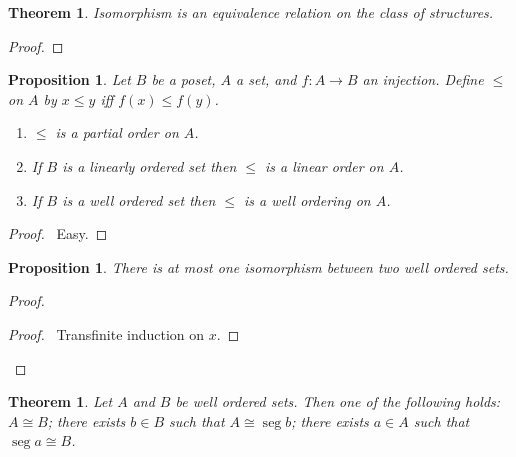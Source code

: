 \documentclass{book}
\let\qed\relax
\newtheorem{prop}[ax]{Proposition}
\newtheorem{thm}[ax]{Theorem}
\theoremstyle{definition}
\newcommand{\seg}{\ensuremath{\operatorname{seg}}}
\begin{document}
\begin{thm}
Isomorphism is an equivalence relation on the class of structures.
\end{thm}

\begin{proof}
\pf
{}
\qed
\end{proof}

\begin{prop}
Let $B$ be a poset, $A$ a set, and $f : A \rightarrow B$ an injection. Define $\leq$ on $A$ by $x \leq y$ iff $f(x) \leq f(y)$.
\begin{enumerate}
\item $\leq$ is a partial order on $A$.
\item If $B$ is a linearly ordered set then $\leq$ is a linear order on $A$.
\item If $B$ is a well ordered set then $\leq$ is a well ordering on $A$.
\end{enumerate}
\end{prop}

\begin{proof}
\pf\ Easy. \qed
\end{proof}

\begin{prop}
There is at most one isomorphism between two well ordered sets.
\end{prop}

\begin{proof}
\pf
{}
\begin{proof}
	\pf\ Transfinite induction on $x$.
\end{proof}
\qed
\end{proof}

\begin{thm}
Let $A$ and $B$ be well ordered sets. Then one of the following holds: $A \cong B$; there exists $b \in B$ such that $A \cong \seg b$; there exists $a \in A$ such that $\seg a \cong B$.
\end{thm}
\end{document}
